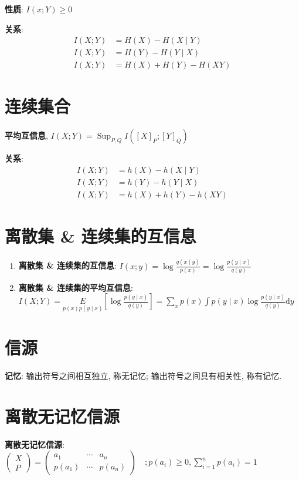 \documentclass{article}
\newcommand{\env}[2]{\begin{#1}#2\end{#1}}
\newcommand{\defi}[2]{\textbf{#1}, #2}
\begin{document}
                \textbf{性质}: $I(x ; Y) \ge 0$
                
                \textbf{关系}: 
                    \env{align*}{
                        I(X ; Y) &= H(X)-H(X \mid Y) \\
                        I(X ; Y) &= H(Y)-H(Y \mid X) \\
                        I(X ; Y) &= H(X)+H(Y)-H(X Y)
                    }
             
            \section{连续集合}
                \defi{平均互信息}{$I(X ; Y)=\operatorname{Sup}_{P, Q} I\left([X]_{P} ;[Y]_{Q}\right)$}
                
                \textbf{关系}:
                    \env{align*}{
                        I(X ; Y) &= h(X)-h(X \mid Y) \\
                        I(X ; Y) &= h(Y)-h(Y \mid X) \\
                        I(X ; Y) &= h(X)+h(Y)-h(X Y)
                    }
                    
            \section{离散集 \& 连续集的互信息}
                \env{enumerate}{
                    \item \textbf{离散集 \& 连续集的互信息}: $I(x ; y)=\log \frac{q(x \mid y)}{p(x)}=\log \frac{p(y \mid x)}{q(y)}$
                    \item \textbf{离散集 \& 连续集的平均互信息}: $I(X ; Y)=\underset{p(x) p(y \mid x)}{E}\left[\log \frac{p(y \mid x)}{q(y)}\right]=\sum_{x} p(x) \int p(y \mid x) \log \frac{p(y \mid x)}{q(y)} \mathrm{d} y$
                }
            
            
\section{信源}

    \textbf{记忆}: 输出符号之间相互独立, 称无记忆; 输出符号之间具有相关性, 称有记忆.
    
    \section{离散无记忆信源}
        \textbf{离散无记忆信源}:  $ \left(\begin{array}{l} X \\ P \end{array}\right)
                 = \left(\begin{array}{lll}
                    a_{1} & \cdots & a_{n} \\ p\left(a_{1}\right) & \cdots & p\left(a_{n}\right)
                \end{array}\right) \quad;
                p\left(a_{i}\right) \geqslant 0, \sum_{i=1}^{n} p\left(a_{i}\right)=1$
                
\end{document}
